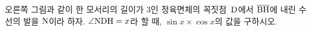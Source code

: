 \noindent\begin{minipage}[t]{0.58\linewidth}\vspace{0pt}\raggedright 오른쪽 그림과 같이 한 모서리의 길이가 $3$인 정육면체의 꼭짓점~$\mathrm{D}$에서 $\overline{\mathrm{BH}}$에 내린 수선의 발을 $\mathrm{N}$이라 하자. $\angle\mathrm{NDH}=x$라 할 때, $\sin x\times\cos x$의 값을 구하시오.\end{minipage}\hfill\begin{minipage}[t]{0.4\linewidth}\vspace{0pt}\centering \resizebox{\ifdim\width>\linewidth\linewidth\else\width\fi}{!}{}\end{minipage}\par
